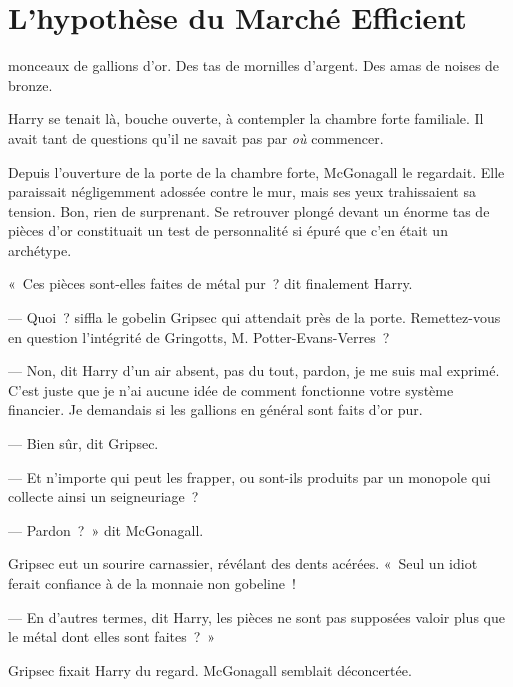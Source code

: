 \chapter[L'hypothèse du Marché Efficient]{L'hypothèse du Marché Efficient\protect\footnotemark}

 monceaux de gallions d'or. Des tas de mornilles d'argent. Des amas de noises de bronze.

\hplettrineextrapara
Harry se tenait là, bouche ouverte, à contempler la chambre forte familiale. Il avait tant de questions qu'il ne savait pas par \emph{où} commencer.

Depuis l'ouverture de la porte de la chambre forte, McGonagall le regardait. Elle paraissait négligemment adossée contre le mur, mais ses yeux trahissaient sa tension. Bon, rien de surprenant. Se retrouver plongé devant un énorme tas de pièces d'or constituait un test de personnalité si épuré que c'en était un archétype.

«~Ces pièces sont-elles faites de métal pur~? dit finalement Harry.

--- Quoi~? siffla le gobelin Gripsec qui attendait près de la porte. Remettez-vous en question l'intégrité de Gringotts, M.  Potter-Evans-Verres~?

--- Non, dit Harry d'un air absent, pas du tout, pardon, je me suis mal exprimé. C'est juste que je n'ai aucune idée de comment fonctionne votre système financier. Je demandais si les gallions en général sont faits d'or pur.

--- Bien sûr, dit Gripsec.

--- Et n'importe qui peut les frapper, ou sont-ils produits par un monopole qui collecte ainsi un seigneuriage~?

--- Pardon~?~» dit McGonagall.

Gripsec eut un sourire carnassier, révélant des dents acérées. «~Seul un idiot ferait confiance à de la monnaie non gobeline~!

--- En d'autres termes, dit Harry, les pièces ne sont pas supposées valoir plus que le métal dont elles sont faites~?~»

Gripsec fixait Harry du regard. McGonagall semblait déconcertée.

